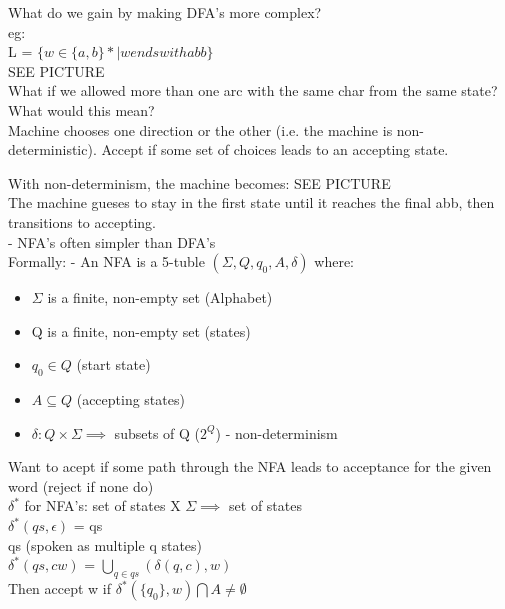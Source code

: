 \documentclass[12pt]{article}
\begin{document}
	What do we gain by making DFA's more complex?\\
	eg: \\
	
	L = $\{w \in \{a,b\}* | w ends with abb \}$\\
	SEE PICTURE\\
	
	What if we allowed more than one arc with the same char from the same state?\\
	
	What would this mean?\\
	Machine chooses one direction or the other (i.e. the machine is non-deterministic). Accept if some set of choices leads to an accepting state.
	
	With non-determinism, the machine becomes: SEE PICTURE\\
	
	The machine gueses to stay in the first state until it reaches the final abb, then transitions to accepting.\\
	- NFA's often simpler than DFA's\\
	
	Formally: - An NFA is a 5-tuble $(\Sigma, Q, q_0, A, \delta)$ where:
	\begin{itemize}
		\item $\Sigma$ is a finite, non-empty set (Alphabet)
		\item Q is a finite, non-empty set (states)
		\item $q_0 \in Q$ (start state)
		\item $A \subseteq Q$ (accepting states)
		\item $\delta: Q \times \Sigma \implies$ subsets of Q ($2^Q$) - non-determinism
	\end{itemize}
	
	Want to acept if some path through the NFA leads to acceptance for the given word (reject if none do)\\
	
	$\delta^*$ for NFA's: set of states X $\Sigma \implies$ set of states\\
	
	$\delta^*(qs, \epsilon)$ = qs\\
	qs (spoken as multiple q states)\\
	$\delta^*(qs, cw)$ = $\bigcup_{q \in qs}(\delta(q,c), w)$\\
	
	Then accept w if $\delta^*(\{q_0\},w) \bigcap A \neq \emptyset$\\
	
\end{document}
